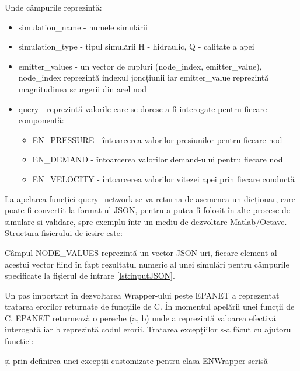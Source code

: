 
Unde câmpurile reprezintă:
\begin{itemize}
    \item simulation\_name - numele simulării
    \item simulation\_type - tipul simulării H - hidraulic, Q - calitate a apei
    \item emitter\_values - un vector de cupluri (node\_index, emitter\_value), node\_index reprezintă indexul joncțiunii iar emitter\_value reprezintă magnitudinea scurgerii din acel nod
    \item query - reprezintă valorile care se doresc a fi interogate pentru fiecare componentă:
    \begin{itemize}
        \item EN\_PRESSURE - întoarcerea valorilor presiunilor pentru fiecare nod
        \item EN\_DEMAND - întoarcerea valorilor demand-ului pentru fiecare nod
        \item EN\_VELOCITY - întoarcerea valorilor vitezei apei prin fiecare conductă
    \end{itemize}
\end{itemize}
La apelarea funcției query\_network se va returna de asemenea un dicționar, care poate fi convertit la format-ul JSON, pentru a putea fi folosit în alte procese de simulare și validare, spre exemplu într-un mediu de dezvoltare Matlab/Octave. Structura fișierului de ieșire este:




Câmpul NODE\_VALUES reprezintă un vector JSON-uri, fiecare element al acestui vector fiind în fapt rezultatul numeric al unei simulări pentru câmpurile specificate la fișierul de intrare \ref{lst:inputJSON}.

Un pas important în dezvoltarea Wrapper-ului peste EPANET a reprezentat tratarea erorilor returnate de funcțiile de C. În momentul apelării unei funcții de C, EPANET returnează o pereche (a, b) unde a reprezintă valoarea efectivă interogată iar b reprezintă codul erorii. Tratarea excepțiilor s-a făcut cu ajutorul funcției:



și prin definirea unei excepții customizate pentru clasa ENWrapper scrisă

